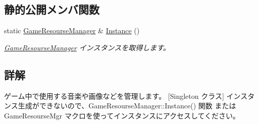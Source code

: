 \subsection*{静的公開メンバ関数}
\begin{DoxyCompactItemize}
\item 
static \hyperlink{class_game_resourse_manager}{Game\+Resourse\+Manager} \& \hyperlink{class_game_resourse_manager_acec2038a01e96c4f44dca817bff407ad}{Instance} ()
\begin{DoxyCompactList}\small\item\em \hyperlink{class_game_resourse_manager}{Game\+Resourse\+Manager} インスタンスを取得します。\end{DoxyCompactList}\end{DoxyCompactItemize}


\subsection{詳解}
ゲーム中で使用する音楽や画像などを管理します。 \mbox{[}Singleton クラス\mbox{]} インスタンス生成ができないので、\+Game\+Resourse\+Manager\+::\+Instance() 関数 または Game\+Resourse\+Mgr マクロを使ってインスタンスにアクセスしてください。 

